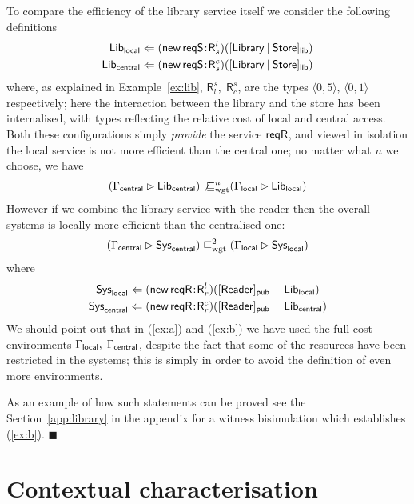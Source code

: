 \documentclass{LMCS}
\newcommand{\pfn}[1]{\mathsf{#1}}  \newcommand{\cfn}[1]{\mathsf{#1}}  \newcommand{\ownfnt}[1]{{\mathsf{#1}}}
\newcommand{\with}{\mathbin \rhd}
\newcommand{\amort}[1]{\mathrel{\sqsubseteq_{\rm wgt}^{#1}}}
\def\pair(#1,#2){\langle #1 , #2 \rangle}\newcommand{\parrow}{ \mathbin{\rightharpoonup}}
\newcommand{\typeletter}[1]{{\mathsf{#1}}}
\newcommand{\tR}{\typeletter{R}}
\newcommand{\Cassoc}[2]{ {{#1}\kern -0.2em : \kern -0.2em {#2}}}
\newcommand{\Cnew}[2]{(\mathop{\pfn{new}} \Cassoc{#1}{#2})}
\newcommand{\Cpar}{\mathbin{|}}
\newcommand{\Cloc}[2]{[#1]_{\ownfnt{#2}}}
\newcommand{\EndDefBox}{\null\hfill$\blacksquare$}
\newcommand{\boxHere}{\global\let\EndProof\empty\EndDefBox}
\begin{document}
\begin{exa}
To compare the efficiency of the library service itself we consider the following definitions
\begin{align*}
 \Lib_\local       &\Leftarrow  \Cnew{\reqS}{\tR^l_s}(\Cloc{\Library \Cpar \Store}{\Clib}) \\
 \Lib_\central       &\Leftarrow \Cnew{\reqS}{\tR^c_s}(\Cloc{\Library \Cpar \Store}{\Clib})  
\end{align*}
where, as explained in Example~\ref{ex:lib}, 
$\tR_l^s,\;\tR_c^s$, are the types $\pair(0,5),\, \pair(0,1)$ respectively; here the interaction
between the library and the store has been internalised, with  types  reflecting the relative cost of
local and central access.  Both these configurations simply \emph{provide} the service 
$\reqR$, and viewed in isolation the local service is not more efficient than the central one; no matter what
$n$ we choose, we have 
\begin{align}\label{ex:a}
  ( \Gamma_{\central} \with \Lib_\central)   \not{\amort{n}} (\Gamma_{\local} \with \Lib_\local)   
\end{align}
However if we combine the library service with the reader then the overall systems is locally more efficient
than the centralised one:
\begin{align}\label{ex:b}
  ( \Gamma_{\central} \with \Sys_\central)   \amort{2} (\Gamma_{\local} \with \Sys_\local)   
\end{align}
where
\begin{align*}
  \Sys_\local &\Leftarrow \Cnew{\reqR}{\tR^l_r} (\Cloc{\Reader}{\Cpublic} \;\Cpar\; \Lib_\local)\\
  \Sys_\central &\Leftarrow \Cnew{\reqR}{\tR^c_r} (\Cloc{\Reader}{\Cpublic} \;\Cpar\; \Lib_\central)
\end{align*}
We should point out that in (\ref{ex:a}) and (\ref{ex:b}) we have used the full cost environments
$\Gamma_\local,\;\Gamma_\central$, despite the fact that some of the resources have been restricted in
the systems; this is simply in order to avoid the definition of even more environments. 

As an example of how such statements can be proved see the Section~\ref{app:library} in the appendix for a witness bisimulation which
establishes (\ref{ex:b}).  
\boxHere
\end{exa}




\section{Contextual characterisation}\label{sec:cxt}
\end{document}
